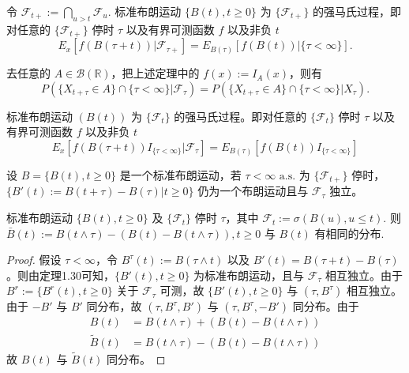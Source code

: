 \documentclass[lang=cn,10pt,thmcnt=section]{elegantbook}
\begin{document}
\begin{theorem}
	令 $\mathcal{F}_{t+} := \bigcap_{u > t} \mathcal{F}_u$. 标准布朗运动 $\{B(t), t \geq 0\}$ 为 $\{\mathcal{F}_{t+}\}$ 的强马氏过程，即对任意的 $\{\mathcal{F}_{t+}\}$ 停时 $\tau$ 以及有界可测函数 $f$ 以及非负 $t$
\[ E_x[f(B(\tau + t)) | \mathcal{F}_{\tau+}] = E_{B(\tau)}[f(B(t)) | \{\tau < \infty\}]. \]

\end{theorem}
\begin{remark}
	去任意的 $A \in \mathcal{B}(\mathbb{R})$，把上述定理中的 $f(x) := I_A(x)$，则有
\[ P(\{X_{t+\tau} \in A\} \cap \{\tau < \infty\} | \mathcal{F}_\tau) = P(\{X_{t+\tau} \in A\} \cap \{\tau < \infty\} | X_\tau). \]

\end{remark}

\begin{theorem}
	标准布朗运动 $(B(t))$ 为 $\{\mathcal{F}_t\}$ 的强马氏过程。即对任意的 $\{\mathcal{F}_t\}$ 停时 $\tau$ 以及有界可测函数 $f$ 以及非负 $t$
\[ E_x[f(B(\tau + t)) I_{\{\tau < \infty\}} | \mathcal{F}_\tau] = E_{B(\tau)}[f(B(t)) I_{\{\tau < \infty\}}] \]
\end{theorem}
\begin{theorem}
	设 $B = \{B(t), t \geq 0\}$ 是一个标准布朗运动，若 $\tau < \infty \text{ a.s.}$ 为 $\{\mathcal{F}_{t+}\}$ 停时，$\{B'(t) := B(t + \tau) - B(\tau) | t \geq 0\}$ 仍为一个布朗运动且与 $\mathcal{F}_\tau$ 独立。

\end{theorem}
\begin{theorem}
	标准布朗运动 $\{B(t), t \geq 0\}$ 及 $\{\mathcal{F}_t\}$ 停时 $\tau$，其中 $\mathcal{F}_t := \sigma(B(u), u \leq t)$. 则 $\bar{B}(t) := B(t \wedge \tau) - (B(t) - B(t \wedge \tau)), t \geq 0$ 与 $B(t)$ 有相同的分布.
\end{theorem}
\begin{proof}
	假设 $\tau < \infty$，令 $B^\tau(t) := B(\tau \wedge t)$ 以及 $B'(t) = B(\tau + t) - B(\tau)$。则由定理1.30可知，$\{B'(t), t \geq 0\}$ 为标准布朗运动，且与 $\mathcal{F}_\tau$ 相互独立。由于 $B^r := \{B^r(t), t \geq 0\}$ 关于 $\mathcal{F}_\tau$ 可测，故 $\{B'(t), t \geq 0\}$ 与 $(\tau, B^\tau)$ 相互独立。由于 $-B'$ 与 $B'$ 同分布，故 $(\tau, B^\tau, B')$ 与 $(\tau, B^\tau, -B')$ 同分布。由于
\begin{align*}
B(t) &= B(t \wedge \tau) + (B(t) - B(t \wedge \tau)) \\
\tilde{B}(t) &= B(t \wedge \tau) - (B(t) - B(t \wedge \tau))
\end{align*}
故 $B(t)$ 与 $\tilde{B}(t)$ 同分布。
\end{proof}
\end{document}
